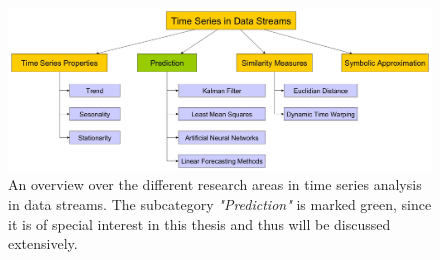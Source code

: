 \begin{figure}[h]
	\centering
  	\includegraphics[width=\textwidth]{timeSeriesInDataStreamsOverview}
	\caption[Time Series Analysis Overview]{An overview over the different research areas in time series analysis in data streams. The subcategory \textit{"Prediction"} is marked green, since it is of special interest in this thesis and thus will be discussed extensively.}
	\label{fig_timeSeriesInDataStreamsOverview}
\end{figure}

